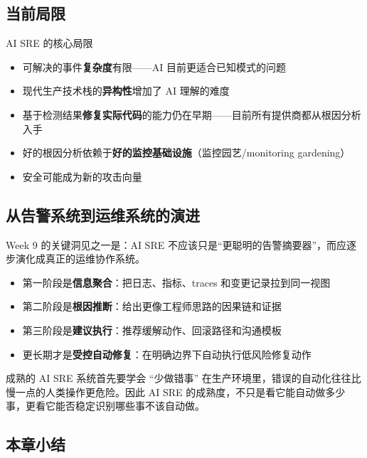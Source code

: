 \documentclass[a4paper]{article}
\begin{document}
\subsection{当前局限}

\begin{warningbox}{AI SRE 的核心局限}
\begin{itemize}
    \item 可解决的事件\textbf{复杂度}有限——AI 目前更适合已知模式的问题
    \item 现代生产技术栈的\textbf{异构性}增加了 AI 理解的难度
    \item 基于检测结果\textbf{修复实际代码}的能力仍在早期——目前所有提供商都从根因分析入手
    \item 好的根因分析依赖于\textbf{好的监控基础设施}（监控园艺/monitoring gardening）
    \item 安全可能成为新的攻击向量
\end{itemize}
\end{warningbox}

\subsection{从告警系统到运维系统的演进}

Week 9 的关键洞见之一是：AI SRE 不应该只是“更聪明的告警摘要器”，而应逐步演化成真正的运维协作系统。

\begin{itemize}
    \item 第一阶段是\textbf{信息聚合}：把日志、指标、traces 和变更记录拉到同一视图
    \item 第二阶段是\textbf{根因推断}：给出更像工程师思路的因果链和证据
    \item 第三阶段是\textbf{建议执行}：推荐缓解动作、回滚路径和沟通模板
    \item 更长期才是\textbf{受控自动修复}：在明确边界下自动执行低风险修复动作
\end{itemize}

\begin{knowledgebox}{成熟的 AI SRE 系统首先要学会 ``少做错事''}
在生产环境里，错误的自动化往往比慢一点的人类操作更危险。因此 AI SRE 的成熟度，不只是看它能自动做多少事，更看它能否稳定识别哪些事不该自动做。
\end{knowledgebox}

\subsection{本章小结}
\end{document}
